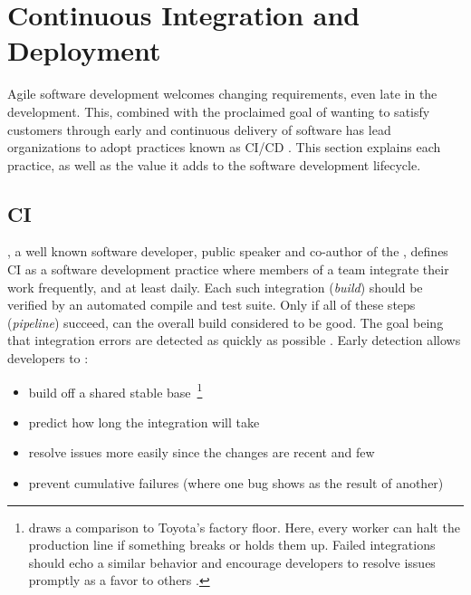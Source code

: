 \section{Continuous Integration and Deployment}
\label{sec:continuous-integration-deployment}

Agile software development welcomes changing requirements, even late in the development. This, combined with the proclaimed goal of wanting to satisfy customers through early and continuous delivery of software has lead organizations to adopt practices known as \ac{CI/CD} \cite{beck2001manifesto} \cite[p.~22]{savor2016continuous} \cite[p.~78]{virmani2015understanding}. This section explains each practice, as well as the value it adds to the software development lifecycle.

\subsection{\acl{CI}}
\label{sec:continuous-integration}

\citeauthor{fowler2006continuous}, a well known software developer, public speaker and co-author of the , defines \ac{CI} as a software development practice where members of a team integrate their work frequently, and at least daily. Each such integration (\textit{build}) should be verified by an automated compile and test suite. Only if all of these steps (\textit{pipeline}) succeed, can the overall build considered to be good. The goal being that integration errors are detected as quickly as possible \cite[pp.~1,~3]{fowler2006continuous}. Early detection allows developers to \cite[pp.~7,~11--12]{fowler2006continuous}:

\begin{itemize}
  \item build off a shared stable base~\footnote{\citeauthor{meyer2014continuous} draws a comparison to Toyota's factory floor. Here, every worker can halt the production line if something breaks or holds them up. Failed integrations should echo a similar behavior and encourage developers to resolve issues promptly as a favor to others \cite[p.~15]{meyer2014continuous}.}
  \item predict how long the integration will take
  \item resolve issues more easily since the changes are recent and few
  \item prevent cumulative failures (where one bug shows as the result of another)
\end{itemize}

